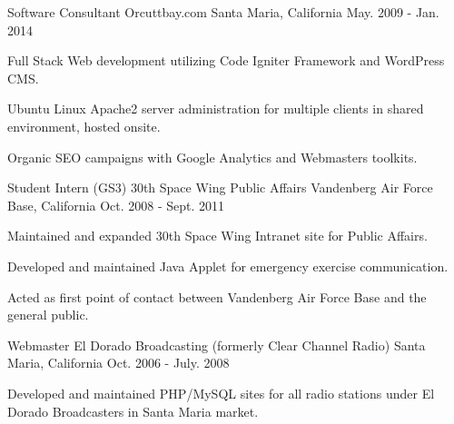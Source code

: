 \begin{cventries}
  \cventry
    {Software Consultant} %
    {Orcuttbay.com} %
    {Santa Maria, California} %
    {May. 2009 - Jan. 2014} %
    {
      \begin{cvitems} %
        \item {Full Stack Web development utilizing Code Igniter Framework and WordPress CMS.}
        \item {Ubuntu Linux Apache2 server administration for multiple clients in shared environment, hosted onsite. }
        \item {Organic SEO campaigns with Google Analytics and Webmasters toolkits.}
      \end{cvitems}
    }

  \cventry
    {Student Intern (GS3)} %
    {30th Space Wing Public Affairs} %
    {Vandenberg Air Force Base, California} %
    {Oct. 2008 - Sept. 2011} %
    {
      \begin{cvitems} %
        \item {Maintained and expanded 30th Space Wing Intranet site for Public Affairs.}
        \item {Developed and maintained Java Applet for emergency exercise communication.}
        \item {Acted as first point of contact between Vandenberg Air Force Base and the general public.}
      \end{cvitems}
    }

  \cventry
    {Webmaster} %
    {El Dorado Broadcasting (formerly Clear Channel Radio)} %
    {Santa Maria, California} %
    {Oct. 2006 - July. 2008} %
    {
      \begin{cvitems} %
        \item {Developed and maintained PHP/MySQL sites for all radio stations under El Dorado Broadcasters in Santa Maria market.}
      \end{cvitems}
    }



\end{cventries}
